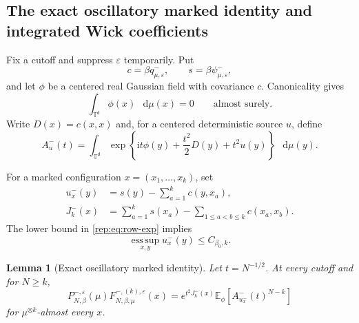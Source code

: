 \documentclass[11pt,reqno]{amsart}
\numberwithin{equation}{section}
\theoremstyle{plain}
\newtheorem{lemma}[lemma]{Lemma}
\theoremstyle{definition}
\renewcommand{\d}{\mathsf d}
\newcommand{\dd}{\mathop{}\!\mathrm d}
\newcommand{\T}{\mathbb T}
\newcommand{\E}{\mathbb E}
\newcommand{\be}{\beta}
\newcommand{\vep}{\varepsilon}
\begin{document}
\subsection{The exact oscillatory marked identity and integrated Wick coefficients}

Fix a cutoff and suppress $\vep$ temporarily. Put
\begin{equation}\label{rep:eq:c-s}
 c=\be q^-_{\mu,\vep},\qquad s=\be\psi^-_{\mu,\vep},
\end{equation}
and let $\phi$ be a centered real Gaussian field with covariance $c$. Canonicality gives
\begin{equation}\label{rep:eq:field-centered}
 \int_{\T^{\d}}\phi(x)\,\dd\mu(x)=0\qquad\text{almost surely}.
\end{equation}
Write $D(x)=c(x,x)$ and, for a centered deterministic source $u$, define
\begin{equation}\label{rep:eq:Aminus}
 A^-_u(t)=\int_{\T^{\d}}
 \exp\left\{\mathrm{i} t\phi(y)+\frac{t^2}{2}D(y)+t^2u(y)\right\}\,\dd\mu(y).
\end{equation}

For a marked configuration $x=(x_1,\ldots,x_k)$, set
\begin{align}
 u_x^-(y)&=s(y)-\sum_{a=1}^kc(y,x_a),\label{rep:eq:ux-minus}\\
 J_k^-(x)&=\sum_{a=1}^ks(x_a)-\sum_{1\le a<b\le k}c(x_a,x_b).\label{rep:eq:J-minus}
\end{align}
The lower bound in \eqref{rep:eq:row-exp} implies
\begin{equation}\label{rep:eq:u-upper}
 \operatorname*{ess\,sup}_{x,y}u_x^-(y)\le C_{\be_0,k}.
\end{equation}

\begin{lemma}[Exact oscillatory marked identity]\label{rep:lem:marked-identity}
Let $t=N^{-1/2}$. At every cutoff and for $N\ge k$,
\begin{equation}\label{rep:eq:marked-identity}
 P_{N,\be}^{-,\vep}(\mu)
 F_{N,\be,\mu}^{-,(k),\vep}(x)
 =e^{t^2J_k^-(x)}
 \E_\phi\left[A^-_{u_x^-}(t)^{N-k}\right]
\end{equation}
for $\mu^{\otimes k}$-almost every $x$.
\end{lemma}
\end{document}
